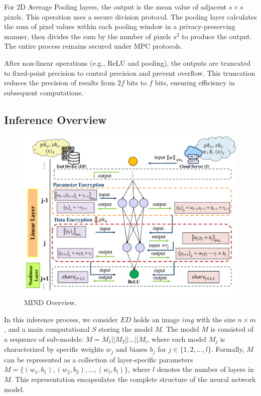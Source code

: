 \documentclass[conference]{IEEEtran}
\begin{document}
For 2D Average Pooling layers, the output is the mean value of adjacent $s \times s$ pixels. This operation uses a secure division protocol. The pooling layer calculates the sum of pixel values within each pooling window in a privacy-preserving manner, then divides the sum by the number of pixels $s^2$ to produce the output. The entire process remains secured under MPC protocols.

After non-linear operations (e.g., ReLU and pooling), the outputs are truncated to fixed-point precision to control precision and prevent overflow. This truncation reduces the precision of results from $2f$ bits to $f$ bits, ensuring efficiency in subsequent computations.

\subsection{Inference Overview}


\begin{figure}[ht]
\centering
\includegraphics[scale=0.7]{fig3.pdf}
\caption{MIND Overview.} \label{fig:MIND Overview}
\end{figure}


In this inference process, we consider $ED$ holds an image $img$ with the size $n\times m$, and a main computational $S$ storing the model $M$. The model $M$ is consisted of a sequence of sub-models: $M=M_1 || M_2 || \dots || M_l$, where each model $M_j$ is characterized by specific weights $w_{j}$ and biases $b_{j}$ for $j \in \{1, 2, \dots, l\}$. Formally, $M$ can be represented as a collection of layer-specific parameters $M=\{(w_{1},b_{1}),(w_{2},b_{2}),\dots,(w_{l},b_{l})\}$, where $l$ denotes the number of layers in $M$. This representation encapsulates the complete structure of the neural network model.
\end{document}
